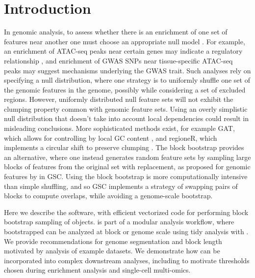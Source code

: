\section{Introduction}

In genomic analysis, to assess whether
there is an enrichment of one set of features near another 
one must choose an appropriate null model \citep{reviewdilemma2014}.
For example, an enrichment of ATAC-seq peaks near certain genes
may indicate a regulatory relationship \citep{lee2020fluent}, 
and enrichment of GWAS SNPs near tissue-specific ATAC-seq peaks may
suggest mechanisms underlying the GWAS trait.
Such analyses rely on specifying a null distribution, where one
strategy is to uniformly shuffle one set of the
genomic features in the genome, possibly while considering a set of
excluded regions.
However, uniformly distributed null feature sets will not exhibit the
clumping property common with genomic feature sets.
Using an overly simplistic null distribution that doesn't take into
account local dependencies could result in misleading conclusions.
More sophisticated methods exist, for example
GAT, which allows for controlling by local GC content
\citep{GAT_2013}, and regioneR, which implements a circular shift to
preserve clumping \citep{gel2016regioner}.
The block bootstrap \citep{politis1999subsampling}
provides an alternative, where one instead generates
random feature sets by sampling large blocks of features from the
original set with replacement, as proposed for 
genomic features by \citet{bickel2010subsampling} in GSC.
Using the block bootstrap is more
computationally intensive than simple shuffling, and so GSC implements
a strategy of swapping pairs of blocks to compute overlaps, while
avoiding a genome-scale bootstrap.

Here we describe the \bootranges software, with efficient
vectorized code for performing block bootstrap sampling of
\granges \citep{lawrence2013software} objects.
\bootranges is part of a modular analysis workflow, where bootstrapped
\granges can be analyzed at block or genome scale using tidy
analysis with \plyranges \citep{lee2019plyranges}.
We provide recommendations for genome segmentation and block length
motivated by analysis of example datasets.
We demonstrate how \bootranges can be incorporated into complex
downstream analyses, including to motivate thresholds chosen during
enrichment analysis and single-cell multi-omics.

